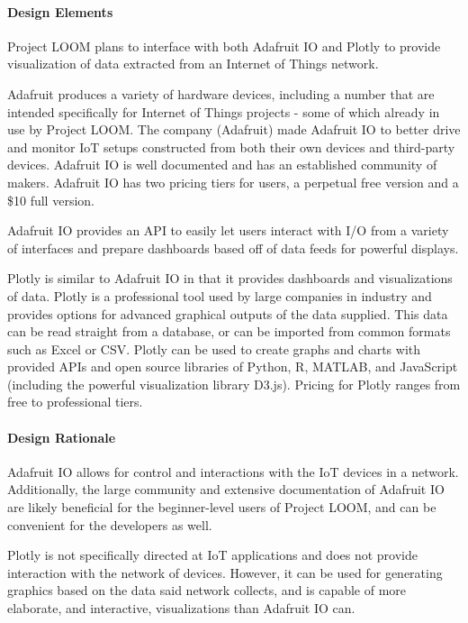 \documentclass[onecolumn, draftclsnofoot,10pt, compsoc]{IEEEtran}
\begin{document}
\paragraph{Design Elements}
Project LOOM plans to interface with both Adafruit IO and Plotly to provide visualization of data extracted from an Internet of Things network.

Adafruit produces a variety of hardware devices, including a number that are intended specifically for Internet of Things projects - some of which already in use by Project LOOM. The company (Adafruit) made Adafruit IO to better drive and monitor IoT setups constructed from both their own devices and third-party devices. Adafruit IO is well documented and has an established community of makers. Adafruit IO has two pricing tiers for users, a perpetual free version and a \$10 full version.

Adafruit IO provides an API to easily let users interact with I/O from a variety of interfaces and prepare dashboards based off of data feeds for powerful displays. \cite{adafruitio}

Plotly is similar to Adafruit IO in that it provides dashboards and visualizations of data. Plotly is a professional tool used by large companies in industry and provides options for advanced graphical outputs of the data supplied. This data can be read straight from a database, or can be imported from common formats such as Excel or CSV. Plotly can be used to create graphs and charts with provided APIs and open source libraries of Python, R, MATLAB, and JavaScript (including the powerful visualization library D3.js). Pricing for Plotly ranges from free to professional tiers. \cite{plotly}

\paragraph{Design Rationale}
Adafruit IO allows for control and interactions with the IoT devices in a network. Additionally, the large community and extensive documentation of Adafruit IO are likely beneficial for the beginner-level users of Project LOOM, and can be convenient for the developers as well.

Plotly is not specifically directed at IoT applications and does not provide interaction with the network of devices. However, it can be used for generating graphics based on the data said network collects, and is capable of more elaborate, and interactive, visualizations than Adafruit IO can.
\end{document}
